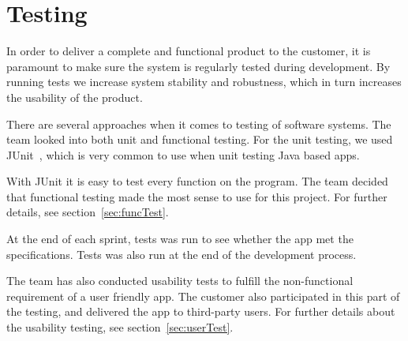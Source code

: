 \chapter{Testing}

In order to deliver a complete and functional product to the customer, it is paramount to make sure the system is regularly tested during development. 
By running tests we increase system stability and robustness, which in turn increases the usability of the product. 

There are several approaches when it comes to testing of software systems. The team looked into both \gls{unit} and functional testing. For the unit testing, we used JUnit~\cite{junit}, which is very common to use when unit testing Java based apps.

With JUnit it is easy to test every function on the program. The team decided that functional testing made the most sense to use for this project. For further details, see section~\ref{sec:funcTest}.


At the end of each sprint, tests was run to see whether the app met the specifications. Tests was also run at the end of the development process. 

The team has also conducted usability tests to fulfill the non-functional requirement of a user friendly app. The customer also participated in this part of the testing, and delivered the app to third-party users. For further details about the usability testing, see section~\ref{sec:userTest}.
\newpage


